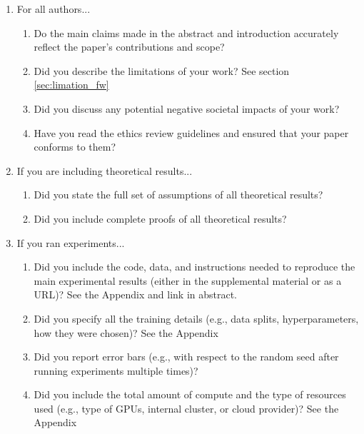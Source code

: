 \documentclass{article}
\begin{document}
\begin{enumerate}


\item For all authors...
\begin{enumerate}
  \item Do the main claims made in the abstract and introduction accurately reflect the paper's contributions and scope?
    \answerYes{}
  \item Did you describe the limitations of your work?
    \answerYes{} See section \ref{sec:limation_fw}
  \item Did you discuss any potential negative societal impacts of your work?
    \answerNo{}
  \item Have you read the ethics review guidelines and ensured that your paper conforms to them?
    \answerYes{}
\end{enumerate}


\item If you are including theoretical results...
\begin{enumerate}
  \item Did you state the full set of assumptions of all theoretical results?
    \answerNA{}
        \item Did you include complete proofs of all theoretical results?
    \answerNA{}
\end{enumerate}


\item If you ran experiments...
\begin{enumerate}
  \item Did you include the code, data, and instructions needed to reproduce the main experimental results (either in the supplemental material or as a URL)?
    \answerYes{} See the Appendix and link in abstract. 
  \item Did you specify all the training details (e.g., data splits, hyperparameters, how they were chosen)?
    \answerYes{} See the Appendix
        \item Did you report error bars (e.g., with respect to the random seed after running experiments multiple times)?
    \answerNo{}
        \item Did you include the total amount of compute and the type of resources used (e.g., type of GPUs, internal cluster, or cloud provider)?
    \answerYes{} See the Appendix
\end{enumerate}



\end{enumerate}
\end{document}
